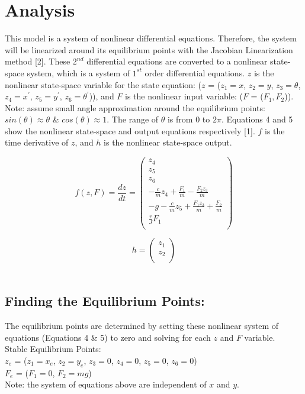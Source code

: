 \documentclass[conference]{IEEEtran}
\begin{document}
\newpage
\section{Analysis}
This model is a system of nonlinear differential equations. Therefore, the system will be linearized around its equilibrium points with the Jacobian Linearization method [2]. These $2^{nd}$ differential equations are converted to a nonlinear state-space system, which is a system of $1^{st}$  order differential equations. $z$ is the nonlinear state-space variable for the state equation: ($z$ = ($z_1 = x$, $z_2 = y$, $z_3 = \theta$, $z_4 = x^\prime$, $z_5 = y^\prime$, $z_6 = \theta^\prime$)), and $F$ is the nonlinear input variable: ($F$ = ($F_1,F_2$)).\\

Note: assume small angle approximation around the equilibrium points: $sin(\theta) \approx \theta$ \& $cos(\theta) \approx 1$. The range of $\theta$ is from 0 to $2\pi$. Equations 4 and 5 show the nonlinear state-space and output equations respectively [1]. $f$ is the time derivative of $z$, and $h$ is the nonlinear state-space output.

\[
f(z,F) = \frac{dz}{dt} =
\begin{pmatrix}
z_4\\
z_5\\
z_6 \\
-\frac{c}{m}z_4 + \frac{F_1}{m} -\frac{F_2z_3}{m}\\
-g - \frac{c}{m}z_5 + \frac{F_1z_3}{m} +\frac{F_2}{m}\\
\frac{r}{J}F_1\\
\end{pmatrix}  
\tag{4}
\]

\[
h = 
\begin{pmatrix}
z_1\\
z_2\\
\end{pmatrix}
\tag{5}
\]\\

\subsection{Finding the Equilibrium Points:}
The equilibrium points are determined by setting these nonlinear system of equations (Equations 4 \& 5) to zero and solving for each $z$ and $F$ variable. \\

\noindent Stable Equilibrium Points: \\
\indent $z_e$ = ($z_1 = x_e$, $z_2 = y_e$, $z_3 = 0$, $z_4 = 0$, $z_5 = 0$, $z_6 = 0$)\\
\indent $F_e$ = ($F_1 = 0$, $F_2 = mg$)\\
Note: the system of equations above are independent of $x$ and $y$. \\
\end{document}
